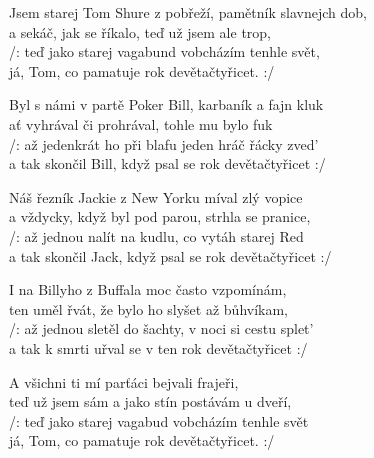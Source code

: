 
\ve{}
Jsem starej Tom Shure z pobřeží, pamětník slavnejch dob,\\
a sekáč, jak se říkalo, teď už jsem ale trop,\\
/: teď jako starej vagabund vobcházím tenhle svět,\\
já, Tom, co pamatuje rok devětačtyřicet. :/

\ve{}
Byl s námi v partě Poker Bill, karbaník a fajn kluk\\
ať vyhrával či prohrával, tohle mu bylo fuk\\
/: až jedenkrát ho při blafu jeden hráč řácky zved'\\
a tak skončil Bill, když psal se rok devětačtyřicet :/

\ve{}
Náš řezník Jackie z New Yorku míval zlý vopice\\
a vždycky, když byl pod parou, strhla se pranice,\\
/: až jednou nalít na kudlu, co vytáh starej Red\\
a tak skončil Jack, když psal se rok devětačtyřicet :/

\ve{}
I na Billyho z Buffala moc často vzpomínám,\\
ten uměl řvát, že bylo ho slyšet až bůhvíkam,\\
/: až jednou sletěl do šachty, v noci si cestu splet'\\
a tak k smrti uřval se v ten rok devětačtyřicet :/

\ve{}
A všichni ti mí parťáci bejvali frajeři,\\
teď už jsem sám a jako stín postávám u dveří,\\
/: teď jako starej vagabud vobcházím tenhle svět\\
já, Tom, co pamatuje rok devětačtyřicet. :/

\esong